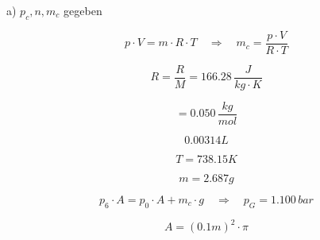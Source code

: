 a) $p_c, n, m_c$ gegeben

\[
p \cdot V = m \cdot R \cdot T \quad \Rightarrow \quad m_c = \frac{p \cdot V}{R \cdot T}
\]

\[
R = \frac{R}{M} = 166.28 \, \frac{J}{kg \cdot K}
\]

\[
= 0.050 \, \frac{kg}{mol}
\]

\[
0.00314L
\]

\[
T = 738.15K
\]

\[
m = 2.687g
\]

\[
p_6 \cdot A = p_0 \cdot A + m_c \cdot g \quad \Rightarrow \quad p_G = 1.100 \, bar
\]

\[
A = (0.1m)^2 \cdot \pi
\]